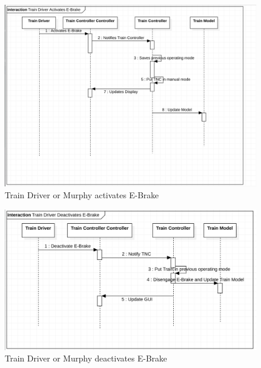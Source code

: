 \documentclass{article}
\begin{document}
    \begin{figure}[H]
        \centering
        \includegraphics[width=\textwidth]{./TNCSD/TRNDriverActEBrake.png}
        \caption{Train Driver or Murphy activates E-Brake}
        \label{fig:Train Driver or Murphy activates E-Brake}
    \end{figure}
    
    \begin{figure}[H]
        \centering
        \includegraphics[width=\textwidth]{./TNCSD/TRNDRiverDeactEBrake.png}
        \caption{Train Driver or Murphy deactivates E-Brake}
        \label{fig:Train Driver or Murphy deactivates E-Brake}
    \end{figure}
    
\end{document}
